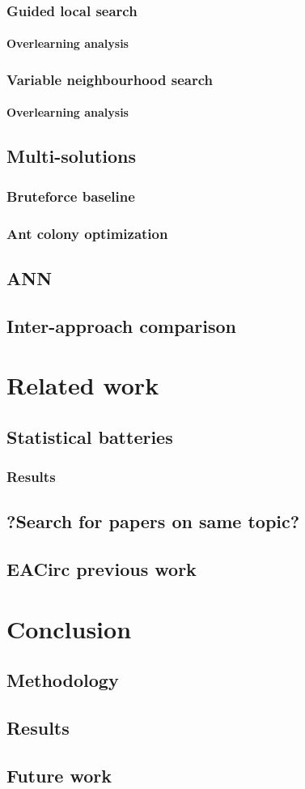 \documentclass[
  print, %
  Table,   %
  nolof,     %
  nolot,     %
  draft, %
  11pt, %
  oneside  %
]{fithesis3}
\begin{document}
\subsection{Guided local search}
\subsubsection{Overlearning analysis}
\subsection{Variable neighbourhood search}
\subsubsection{Overlearning analysis}
\section{Multi-solutions}
\subsection{Bruteforce baseline}
\subsection{Ant colony optimization}
\section{ANN}
\section{Inter-approach comparison}

\chapter{Related work}

\section{Statistical batteries}
\subsection{Results}
\section{?Search for papers on same topic?}
\section{EACirc previous work}

\chapter{Conclusion}

\section{Methodology}
\section{Results}
\section{Future work}
\end{document}

